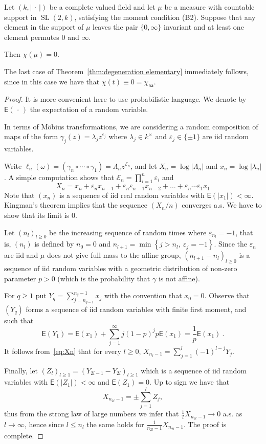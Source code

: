 \documentclass[10pt]{amsart}
\theoremstyle{definition}\newtheorem{defi}[theo]{Definition}\newtheorem{rema}[theo]{Remark}\newtheorem{exam}[theo]{Example}\newtheorem{exem}[theo]{Example}\newtheorem{nota}[theo]{Notation}
\DeclareMathOperator{\SL}{SL}
\newcommand{\sE}{\mathsf{E}}
\newcommand{\e}{\varepsilon}
\newcommand{\set}[1]{\left\{#1\right\}}
\newcommand{\abs}[1]{\left\vert#1\right\vert}
\newcommand{\unsur}[1]{\frac{1}{#1}}
\newcommand{\la}{\lambda}
\newcommand{\na}{\mathsf{na}}
\newcommand{\SLk}{\SL(2,k)}
\begin{document}
\begin{prop}\label{prop:formula 0infty}
Let $(k,\abs{{\,\cdot\,}})$ be a complete valued field and let $\mu$ be a measure with countable support in $\SLk$, satisfying the moment condition (B2). Suppose that any element in the support of $\mu$ leaves the pair $\{0,\infty\}$ invariant and at least one element permutes $0$ and $\infty$.

Then $\chi(\mu) = 0$.
\end{prop}

The last case of Theorem~\ref{thm:degeneration elementary} immediately follows, since in this case we have that $\chi(t) \equiv 0 = \chi_\na $.

\begin{proof}
It is more convenient here to use probabilistic language. We denote by $\sE({\,\cdot\,})$ the expectation of a random variable.

In terms of M\"obius transformations, we are considering a random composition of maps of the form $\gamma_j(z) = \la_j z^{\e_j}$ where $\lambda_j\in k^\times$ and $\e_j \in \{\pm1\}$ are iid random variables.

Write $\ell_n(\omega) = (\gamma_n \circ \cdots \circ \gamma_1) = \Lambda_n z^{\mathcal{E}_n}$, and let $X_n = \log |\Lambda_n|$ and $x_n = \log|\lambda_n|$. A simple computation shows that $\mathcal{E}_n = \prod_{i=1}^{n} \e_i$ and
\begin{equation}\label{eq:Xn}
X_n = x_n + \e_n x_{n-1} + \e_n \e_{n-1} x_{n-2} + \ldots + \e_n\cdots \e_1 x_1
\end{equation}
Note that $(x_n)$ is a sequence of iid real random variables with $\sE(\abs{x_1})<\infty$. Kingman's theorem implies that the sequence $(X_n/n)$ converges a.s. We have to show that its limit is 0.

Let $(n_l)_{l\ge0}$ be the increasing sequence of random times where $\e_{n_l} = -1$, that is, $(n_l)$ is defined by $n_0=0$ and $n_{l+1} = \min\set{j> n_l, \ \e_j = -1}$. Since the $\e_n$ are iid and $\mu$ does not give full mass to the affine group, $(n_{l+1} - n_l)_{l\geq 0}$ is a sequence of iid random variables with a geometric distribution of non-zero parameter $p>0$ (which is the probability that $\gamma$ is not affine).

For $q\geq 1$ put $Y_q = \sum_{j=n_{q-1}}^{n_{q}-1} x_j$ with the convention that $x_0=0$. Observe that $(Y_q)$ forms a sequence of iid random variables with finite first moment, and such that
\[
\sE({Y_1}) = \sE({x_1})+ \sum_{j=1}^{\infty} j(1-p)^j p \sE({x_1}) = \unsur{p} \sE({x_1})~.
\]
It follows from~\eqref{eq:Xn} that for every $l\geq 0$, $X_{n_l-1} = \sum_{j=1}^l (-1)^{l-j} Y_j$.

Finally, let $(Z_{l})_{l\geq 1} =(Y_{2l-1}-Y_{2l})_{l\geq 1} $ which is a sequence of iid random variables with $\sE(\abs{Z_1})<\infty$ and $\sE({Z_1})=0$. Up to sign we have that
\[
X_{n_{2l}-1} = \pm \sum_{j=1}^l Z_j,
\]
thus from the strong law of large numbers we infer that $\unsur{l} X_{n_{2l}-1} \to 0$ a.s. as $l\to \infty$, hence since $l\le n_l$ the same holds for $\unsur{n_{2l}-1} X_{n_{2l}-1}$. The proof is complete.
\end{proof}
\end{document}
